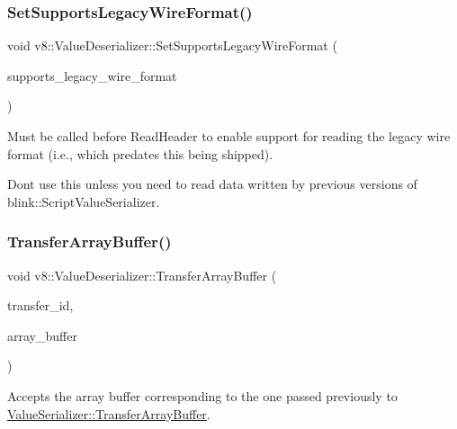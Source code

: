 \subsubsection{\texorpdfstring{Set\+Supports\+Legacy\+Wire\+Format()}{SetSupportsLegacyWireFormat()}}
{\footnotesize\ttfamily void v8\+::\+Value\+Deserializer\+::\+Set\+Supports\+Legacy\+Wire\+Format (\begin{DoxyParamCaption}\item[{bool}]{supports\+\_\+legacy\+\_\+wire\+\_\+format }\end{DoxyParamCaption})}

Must be called before Read\+Header to enable support for reading the legacy wire format (i.\+e., which predates this being shipped).

Don\textquotesingle{}t use this unless you need to read data written by previous versions of blink\+::\+Script\+Value\+Serializer. \mbox{\label{classv8_1_1ValueDeserializer_a853acc2c7b30571d6719ddd92a48da3b}} 
\subsubsection{\texorpdfstring{Transfer\+Array\+Buffer()}{TransferArrayBuffer()}}
{\footnotesize\ttfamily void v8\+::\+Value\+Deserializer\+::\+Transfer\+Array\+Buffer (\begin{DoxyParamCaption}\item[{uint32\+\_\+t}]{transfer\+\_\+id,  }\item[{\mbox{\hyperlink{classv8_1_1Local}{Local}}$<$ \mbox{\hyperlink{classv8_1_1ArrayBuffer}{Array\+Buffer}} $>$}]{array\+\_\+buffer }\end{DoxyParamCaption})}

Accepts the array buffer corresponding to the one passed previously to \mbox{\hyperlink{classv8_1_1ValueSerializer_a27007f2530a496275ccf7b8846f1d9c5}{Value\+Serializer\+::\+Transfer\+Array\+Buffer}}. \mbox{\label{classv8_1_1ValueDeserializer_a3730fe24f81054d6f75a1b23f77a0e6c}} 

